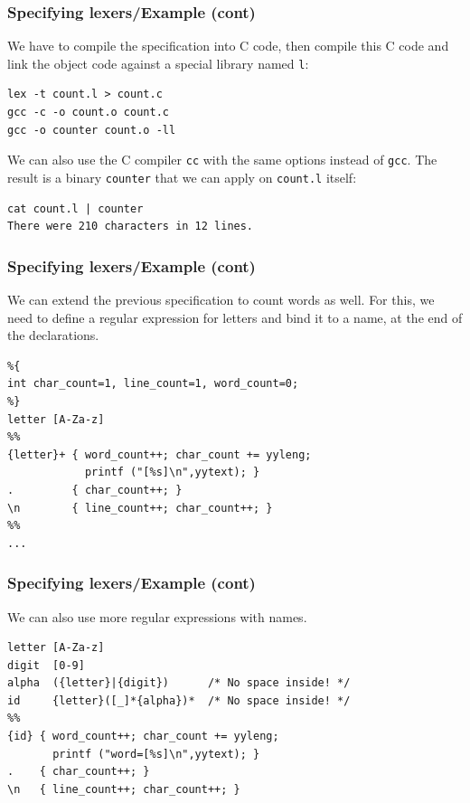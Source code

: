 %
\begin{frame}[containsverbatim]
\frametitle{Specifying lexers/Example (cont)}

We have to compile the \Lex specification into C code, then compile
this C code and link the object code against a special library named
\verb+l+:
{\small
\begin{verbatim}
lex -t count.l > count.c
gcc -c -o count.o count.c
gcc -o counter count.o -ll
\end{verbatim}
}
We can also use the C compiler \texttt{cc} with the same options
instead of \texttt{gcc}. The result is a binary \texttt{counter} that
we can apply on \texttt{count.l} itself:
{\small
\begin{verbatim}
cat count.l | counter
There were 210 characters in 12 lines.
\end{verbatim}
}

\end{frame}

%
\begin{frame}[containsverbatim]
\frametitle{Specifying lexers/Example (cont)}

We can extend the previous specification to count words as well. For
this, we need to define a regular expression for letters and bind it
to a name, at the end of the declarations.
{\small
\begin{verbatim}
%{
int char_count=1, line_count=1, word_count=0;
%}
letter [A-Za-z]
%%
{letter}+ { word_count++; char_count += yyleng;
            printf ("[%s]\n",yytext); }
.         { char_count++; }
\n        { line_count++; char_count++; }
%%
...
\end{verbatim}
}

\end{frame}

%
\begin{frame}[containsverbatim]
\frametitle{Specifying lexers/Example (cont)}

We can also use more regular expressions with names.
{\small
\begin{verbatim}
letter [A-Za-z]
digit  [0-9]
alpha  ({letter}|{digit})      /* No space inside! */
id     {letter}([_]*{alpha})*  /* No space inside! */
%%
{id} { word_count++; char_count += yyleng;
       printf ("word=[%s]\n",yytext); }
.    { char_count++; }
\n   { line_count++; char_count++; }
\end{verbatim}
}
\end{frame}

